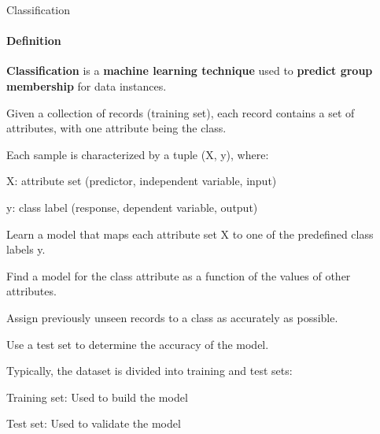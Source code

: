 \documentclass[aspectratio=169]{beamer}
\begin{document}
\begin{frame}{Classification}
    \framesubtitle{Definition}
    \small\centering\textbf{Classification} is a \textbf{machine learning technique} used to \textbf{predict group membership} for data instances.

    \vspace{0.3cm}
    \begin{coloredblock}
        \vspace{0.2cm}
        \begin{tugitemize}
            \item \scriptsize Given a collection of records (training set), each record contains a set of attributes, with one attribute being the class.
            \item \scriptsize Each sample is characterized by a tuple (X, y), where:
            \item \scriptsize X: attribute set (predictor, independent variable, input)
            \item \scriptsize y: class label (response, dependent variable, output)
        \end{tugitemize}
    \end{coloredblock}

    \vspace{0.3cm}

    \begin{coloredblock}
        \vspace{0.2cm}
        \begin{tugitemize}
            \item \scriptsize Learn a model that maps each attribute set X to one of the predefined class labels y.
            \item \scriptsize Find a model for the class attribute as a function of the values of other attributes.
        \end{tugitemize}
    \end{coloredblock}

    \vspace{0.3cm}

    \begin{coloredblock}
        \vspace{0.2cm}
        \begin{tugitemize}
            \item \scriptsize Assign previously unseen records to a class as accurately as possible.
            \item \scriptsize Use a test set to determine the accuracy of the model.
            \item \scriptsize Typically, the dataset is divided into training and test sets:
            \item \scriptsize Training set: Used to build the model
            \item \scriptsize Test set: Used to validate the model
        \end{tugitemize}
    \end{coloredblock}

\end{frame}
\end{document}
